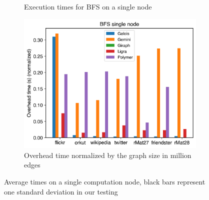 \begin{figure}
\begin{subfigure}{0.3\textwidth}
		\caption{Execution times for BFS on a single node}
		\label{fig:singleNodeBFS_exec}
	\end{subfigure}
	\hfil
	\begin{subfigure}{0.3\textwidth}
		\includegraphics[width=\linewidth]{../../plots/singleNodeBFS_overheadTimeNormalized.png}
		\caption{Overhead time normalized by the graph size in million edges}
		\label{fig:singleNodeBFS_overheadNormalized}
	\end{subfigure}
	
	\caption{Average times on a single computation node, black bars represent one standard deviation in our testing}
\end{figure}




